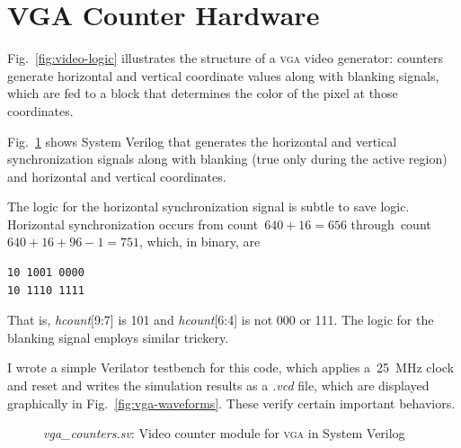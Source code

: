 \documentclass[11pt]{article}
\newcommand{\figref}[1]{Fig.~\ref{fig:#1}}
\begin{document}
\section{VGA Counter Hardware}

\figref{video-logic} illustrates the structure of a \textsc{vga} video
generator: counters generate horizontal and vertical coordinate values
along with blanking signals, which are fed to a block that determines
the color of the pixel at those coordinates.

\figref{vga-counters} shows System Verilog that generates the
horizontal and vertical synchronization signals along with blanking
(true only during the active region) and horizontal and vertical
coordinates.

The logic for the horizontal synchronization signal is subtle to save
logic.  Horizontal synchronization occurs from count~$640 + 16 = 656$
through~count~$640 + 16 + 96 - 1 = 751$, which, in binary, are
%
\begin{verbatim}
10 1001 0000
10 1110 1111
\end{verbatim}
%
That is, \emph{hcount}[9:7] is 101 and \emph{hcount}[6:4] is not
000 or 111.  The logic for the blanking signal employs similar trickery.

I wrote a simple Verilator testbench for this code, which applies
a~25~MHz clock and reset and writes the simulation results as a
\emph{.vcd} file, which are displayed graphically in
\figref{vga-waveforms}.  These verify certain important behaviors.

\begin{figure}

\caption{\emph{vga\_counters.sv}: Video counter module for \textsc{vga} in
  System Verilog}
\label{fig:vga-counters}
\end{figure}

\newcommand{\itempad}{\vspace{1.75\baselineskip}}
\end{document}
